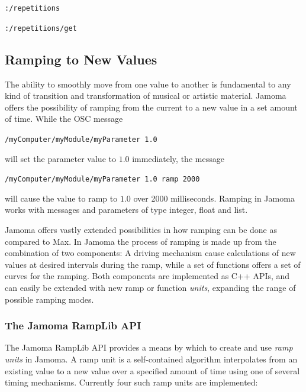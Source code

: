 \documentclass{NIME-alternate}
\begin{document}
\begin{Abstract}
\texttt{:/repetitions}

\texttt{:/repetitions/get}





\subsection{Ramping to New Values} %
\label{sub:ramping_to_new_values}

The ability to smoothly move from one value to another is fundamental to any kind of transition and transformation of musical or artistic material. Jamoma offers the possibility of ramping from the current to a new value in a set amount of time. While the OSC message

\texttt{/myComputer/myModule/myParameter 1.0}

\noindent
will set the parameter value to $1.0$ immediately, the message

\texttt{/myComputer/myModule/myParameter 1.0 ramp 2000}

\noindent
will cause the value to ramp to $1.0$ over 2000 milliseconds. Ramping in Jamoma works with messages and parameters of type integer, float and list.

Jamoma offers vastly extended possibilities in how ramping can be done as compared to Max. In Jamoma the process of ramping is made up from the combination of two components: A driving mechanism cause calculations of new values at desired intervals during the ramp, while a set of functions offers a set of curves for the ramping. Both components are implemented as C++ APIs, and can easily be extended with new ramp or function \emph{units}, expanding the range of possible ramping modes.



\subsubsection{The Jamoma RampLib API} %
\label{ssub:the_ramp_lib}

The Jamoma RampLib API provides a means by which to create and use \emph{ramp units} in Jamoma.  A ramp unit is a self-contained algorithm interpolates from an existing value to a new value over a specified amount of time using one of several timing mechanisms. Currently four such ramp units are implemented:


\end{Abstract}
\end{document}
